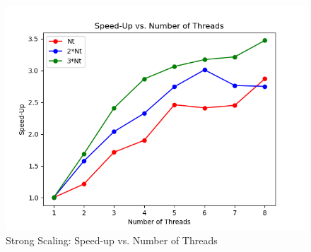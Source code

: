 \documentclass[11pt]{article}
\begin{document}
\begin{enumerate}[leftmargin=0.9in]
\begin{enumerate}[leftmargin=0.3in]
   \begin{figure}[!h]
   \centering
   \includegraphics{./figures/speed_up.png}
   \caption{Strong Scaling: Speed-up vs. Number of Threads}
   \label{fig:1}
   \end{figure}

 \end{enumerate} %

\end{enumerate} %
\end{document}
